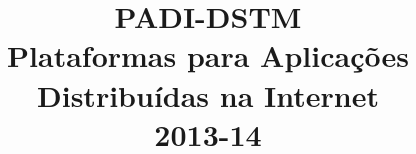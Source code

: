\documentclass[times, 10pt,twocolumn]{article}
\begin{document}
\title{\huge{PADI-DSTM} \\[0,1in] \textmd{Plataformas para Aplicações Distribuídas na Internet \\[0,05in] 2013-14}}

\maketitle
\thispagestyle{empty}

\begin{abstract}

\end{abstract}







\nocite{ex1}


\end{document}
